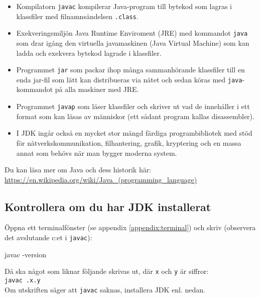\begin{itemize}

\item Kompilatorn \texttt{javac} kompilerar Java-program till bytekod som lagras i klassfiler med filnamnsändelsen \texttt{.class}.

\item Exekveringsmiljön Java Runtime Enviroment (JRE) med kommandot \texttt{java} som drar igång den virtuella javamaskinen (Java Virtual Machine) som kan ladda och exekvera bytekod lagrade i klassfiler.

\item Programmet \texttt{jar} som packar ihop många sammanhörande klassfiler till en enda jar-fil som lätt kan distribueras via nätet och sedan köras med \texttt{java}-kommandot på alla maskiner med JRE.

\item Programmet \texttt{javap} som läser klassfiler och skriver ut vad de innehåller i ett format som kan läsas av människor (ett sådant program kallas disassembler).

\item I JDK ingår också en mycket stor mängd färdiga programbibliotek med stöd för nätverkskommunikation, filhantering, grafik, kryptering och en massa annat som behövs när man bygger moderna system.

\end{itemize}

\noindent Du kan läsa mer om Java och dess historik här: \\
\href{https://en.wikipedia.org/wiki/Java_(programming_language)}{https://en.wikipedia.org/wiki/Java\_(programming\_language)}

\subsection{Kontrollera om du har JDK installerat}\label{appendix:compile:check-jdk}

Öppna ett terminalfönster (se appendix \ref{appendix:terminal}) och skriv (observera det avslutande c:et i \texttt{javac}):
\begin{REPLnonum}
javac -version
\end{REPLnonum}
Då ska något som liknar följande skrivas ut, där \texttt{x} och \texttt{y} är siffror:\\
\texttt{javac \JDKVersion.x.y}\\
Om utskriften säger att \texttt{javac} saknas, installera JDK enl. nedan.

